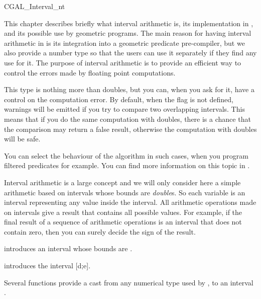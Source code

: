 \begin{ccClass} {CGAL_Interval_nt}
\label{interval}

This chapter describes briefly what interval arithmetic is, its implementation
in {\cgal}, and its possible use by geometric programs.
The main reason for having interval arithmetic in {\cgal} is its integration
into a geometric predicate pre-compiler, but we also provide a number type so
that the users can use it separately if they find any use for it.
The purpose of interval arithmetic is to provide an efficient way to
control the errors made by floating point computations.

This type is nothing more than doubles, but you can, when you ask for it, have
a control on the computation error.
By default, when the flag  is not defined, warnings
will be emitted if you try to compare two overlapping intervals.  This means
that if you do the same computation with doubles, there is a chance that the
comparison may return a false result, otherwise the computation with doubles
will be safe.

You can select the behaviour of the algorithm in such cases, when you program
filtered predicates for example.  You can find more information on this topic
in \cite{bbp-iayed-98scg}.

\ccDefinition
Interval arithmetic is a large concept and we will only consider here a 
simple arithmetic based on intervals whose bounds are {\it double}s.
So each variable is an interval representing any value inside the interval.
All arithmetic operations made on intervals give a result that contains all
possible values.
For example, if the final result of a sequence of arithmetic operations is
an interval that does not contain zero, then you can surely decide the sign 
of the result.


\ccCreation

 {introduces an interval
whose bounds are .}

{introduces the interval [d;e].}

Several functions  provide a cast from any
numerical type used by {\cgal}, to an interval .




\end{ccClass}
